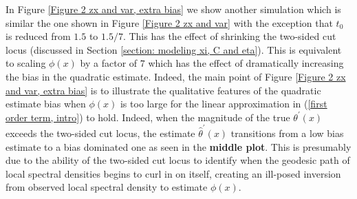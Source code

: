 \documentclass[10pt,noinfoline]{imsart}
\begin{document}
In Figure \ref{Figure 2 zx and var, extra bias} we show another simulation which is similar the one shown in Figure \ref{Figure 2 zx and var} with the exception that $t_0$ is reduced from $1.5$ to $1.5/7$. This has the effect of shrinking the two-sided cut locus (discussed in Section \ref{section: modeling xi, C and eta}). This is  equivalent to scaling $\phi(x)$ by a factor of $7$ which has the effect of dramatically increasing the bias in the quadratic estimate. Indeed, the main point of Figure \ref{Figure 2 zx and var, extra bias} is to illustrate the qualitative features of the quadratic estimate bias when $\phi(x)$ is too large for the linear approximation in (\ref{first order term, intro}) to hold. 
Indeed, when the magnitude of the true $\theta^\prime(x)$ exceeds the two-sided cut locus, the estimate $\hat\theta^\prime(x)$ transitions from a low bias estimate to a bias dominated one as seen in the \textbf{middle plot}. This is presumably due to the ability of the two-sided cut locus to identify when the geodesic path of local spectral densities begins to curl in on itself, creating an ill-posed inversion from observed local spectral density to estimate $\phi(x)$.
 
\end{document}
